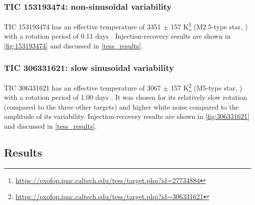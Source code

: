 \documentclass{aastex631}
\newcommand{\footlink}[1]{\footnote{\url{#1}}}
\begin{document}
\subsubsection*{TIC 153193474: non-sinusoidal variability}
TIC 153193474 has an effective temperature of 3351 $\pm$ 157 K\footlink{https://exofop.ipac.caltech.edu/tess/target.php?id=27734884} (M2.5-type star, \citealt{Rajpurohit2013}) with a rotation period of 0.11 days \citep{Ramsay2020}. Injection-recovery results are shown in \autoref{fig:153193474} and discussed in \autoref{tess_results}.

\subsubsection*{TIC 306331621: slow sinusoidal variability}
TIC 306331621 has an effective temperature of 3067 $\pm$ 157 K\footlink{https://exofop.ipac.caltech.edu/tess/target.php?id=306331621} (M5-type star, \citealt{Rajpurohit2013}) with a rotation period of 1.00 days \citep{Ramsay2020}. It was chosen for its relatively slow rotation (compared to the three other targets) and higher white noise compared to the amplitude of its variability. Injection-recovery results are shown in \autoref{fig:306331621} and discussed in \autoref{tess_results}.

\subsection{Results}\label{tess_results}
\end{document}
